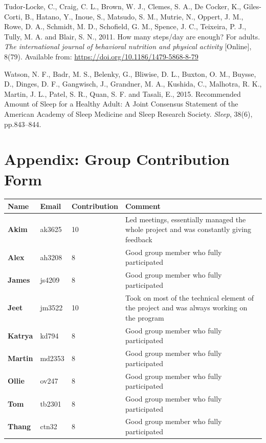 \documentclass[11pt]{article}
\begin{document}
\begin{thebibliography}{99}
    Tudor-Locke, C., Craig, C. L., Brown, W. J., Clemes, S. A., De Cocker, K., 
    Giles-Corti, B., Hatano, Y., Inoue, S., Matsudo, S. M., Mutrie, N., Oppert, J. M., Rowe, D. A., 
    Schmidt, M. D., Schofield, G. M., Spence, J. C., Teixeira, P. J., Tully, M. A. and Blair, S. N., 2011. 
    How many steps/day are enough? For adults. 
    \textit{The international journal of behavioral nutrition and physical activity} 
    [Online], 8(79). Available from: \url{https://doi.org/10.1186/1479-5868-8-79}

    Watson, N. F., Badr, M. S., Belenky, G., Bliwise, D. L., Buxton, O. M., Buysse, D., 
    Dinges, D. F., Gangwisch, J., Grandner, M. A., Kushida, C., Malhotra, R. K., Martin, J. L., Patel, S. R., 
    Quan, S. F. and Tasali, E., 2015. 
    Recommended Amount of Sleep for a Healthy Adult: 
    A Joint Consensus Statement of the American Academy of Sleep Medicine and Sleep Research Society. 
    \textit{Sleep}, 38(6), pp.843–844.
\end{thebibliography}

\newpage
\section{Appendix: Group Contribution Form}

\begin{table}[!ht]
\centering
\begin{tabular}{|p{1.5cm}|p{1.5cm}|p{3cm}|p{6cm}|}
\hline
\textbf{Name} & \textbf{Email} & \textbf{Contribution} & \textbf{Comment} \\
\hline
\textbf{Akim} &  ak3625 & 10 & Led meetings, essentially managed the whole project and was constantly giving feedback  \\
\hline
\textbf{Alex} & ah3208 & 8 & Good group member who fully participated \\
\hline
\textbf{James} & js4209 & 8 & Good group member who fully participated\\
\hline
\textbf{Jeet} & jm3522 & 10 & Took on most of the technical element of the project and was always working on the program\\
\hline
\textbf{Katrya} & kd794 & 8 & Good group member who fully participated\\
\hline
\textbf{Martin} & md2353 & 8 & Good group member who fully participated \\
\hline
\textbf{Ollie} & ov247 & 8 & Good group member who fully participated\\
\hline
\textbf{Tom} & tb2301 & 8 & Good group member who fully participated\\
\hline
\textbf{Thang} & ctn32 & 8 & Good group member who fully participated\\
\hline
\end{tabular}
\end{table}
\end{document}
